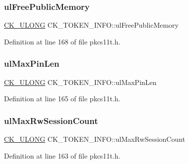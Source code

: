 \subsubsection{\texorpdfstring{ul\+Free\+Public\+Memory}{ulFreePublicMemory}}
{\footnotesize\ttfamily \hyperlink{pkcs11t_8h_a35181858a3b7a0a81f49d180d8f446ef}{C\+K\+\_\+\+U\+L\+O\+NG} C\+K\+\_\+\+T\+O\+K\+E\+N\+\_\+\+I\+N\+F\+O\+::ul\+Free\+Public\+Memory}



Definition at line 168 of file pkcs11t.\+h.

\mbox{\label{struct_c_k___t_o_k_e_n___i_n_f_o_a1f29203a601da021aec840cf41f6e88f}} 
\subsubsection{\texorpdfstring{ul\+Max\+Pin\+Len}{ulMaxPinLen}}
{\footnotesize\ttfamily \hyperlink{pkcs11t_8h_a35181858a3b7a0a81f49d180d8f446ef}{C\+K\+\_\+\+U\+L\+O\+NG} C\+K\+\_\+\+T\+O\+K\+E\+N\+\_\+\+I\+N\+F\+O\+::ul\+Max\+Pin\+Len}



Definition at line 165 of file pkcs11t.\+h.

\mbox{\label{struct_c_k___t_o_k_e_n___i_n_f_o_a3cc3adab228a5db230028a37a77d2db2}} 
\subsubsection{\texorpdfstring{ul\+Max\+Rw\+Session\+Count}{ulMaxRwSessionCount}}
{\footnotesize\ttfamily \hyperlink{pkcs11t_8h_a35181858a3b7a0a81f49d180d8f446ef}{C\+K\+\_\+\+U\+L\+O\+NG} C\+K\+\_\+\+T\+O\+K\+E\+N\+\_\+\+I\+N\+F\+O\+::ul\+Max\+Rw\+Session\+Count}



Definition at line 163 of file pkcs11t.\+h.

